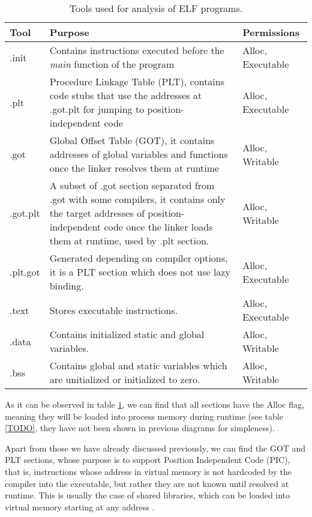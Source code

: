 \begin{table}[htbp]
\begin{tabular}{|>{\centering\arraybackslash}p{1cm}|>{\centering\arraybackslash}p{9cm}|>{\centering\arraybackslash}p{2cm}|}
\hline
Tool & Purpose & Permissions\\
\hline
\hline
.init & Contains instructions executed before the \textit{main} function of the program & Alloc, Executable\\
\hline
.plt & Procedure Linkage Table (PLT), contains code stubs that use the addresses at .got.plt for jumping to position-independent code & Alloc, Executable\\
\hline
.got & Global Offset Table (GOT), it contains addresses of global variables and functions once the linker resolves them at runtime & Alloc, Writable\\
\hline
.got.plt & A subset of .got section separated from .got with some compilers, it contains only the target addresses of position-independent code once the linker loads them at runtime, used by .plt section. & Alloc, Writable\\
\hline
.plt.got & Generated depending on compiler options, it is a PLT section which does not use lazy binding. & Alloc, Executable\\
\hline
.text & Stores executable instructions. & Alloc, Executable\\
\hline
.data & Contains initialized static and global variables. & Alloc, Writable\\
\hline
.bss & Contains global and static variables which are unitialized or initialized to zero. & Alloc, Writable\\
\hline 
\end{tabular}
\caption{Tools used for analysis of ELF programs.}
\label{table:elf_sec_headers}
\end{table}

As it can be observed in table \ref{table:elf_sec_headers}, we can find that all sections have the Alloc flag, meaning they will be loaded into process memory during runtime (see table \ref{TODO}, they have not been shown in previous diagrams for simpleness). 

Apart from those we have already discussed previously, we can find the GOT and PLT sections, whose purpose is to support Position Independent Code (PIC), that is, instructions whose address in virtual memory is not hardcoded by the compiler into the executable, but rather they are not known until resolved at runtime. This is usually the case of shared libraries, which can be loaded into virtual memory starting at any address \cite{plt_got_overlord}.

